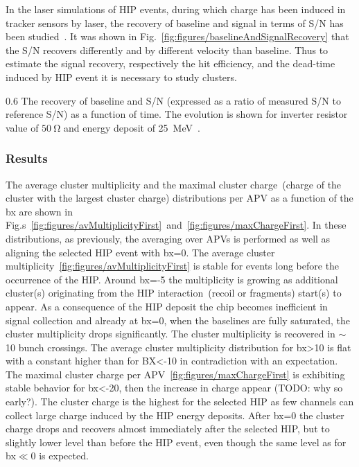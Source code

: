 In the laser simulations of HIP events, during which charge has been induced in tracker sensors by laser, the recovery of baseline and signal in terms of S/N has been studied~\cite{Adam:2005pz}. It was shown in Fig.~\ref{fig:figures/baselineAndSignalRecovery} that the S/N recovers differently and by different velocity than baseline. Thus to estimate the signal recovery, respectively the hit efficiency, and the dead-time induced by HIP event it is necessary to study clusters.

                 {0.6}       %
                 {The recovery of baseline and S/N (expressed as a ratio of measured S/N to reference S/N) as a function of time. The evolution is shown for inverter resistor value of $50~\mathrm{\Omega}$ and energy deposit of 25~MeV~\cite{Adam:2005pz}.} %

\subsubsection{Results}

The average cluster multiplicity and the maximal cluster charge~(charge of the cluster with the largest cluster charge) distributions per APV as a function of the bx are shown in Fig.s~\ref{fig:figures/avMultiplicityFirst}~and~\ref{fig:figures/maxChargeFirst}. In these distributions, as previously, the averaging over APVs is performed as well as aligning the selected HIP event with bx=0. The average cluster multiplicity~\ref{fig:figures/avMultiplicityFirst} is stable for events long before the occurrence of the HIP. Around bx=-5 the multiplicity is growing as additional cluster(s) originating from the HIP interaction~(recoil or fragments) start(s) to appear. As a consequence of the HIP deposit the chip becomes inefficient in signal collection and already at bx=0, when the baselines are fully saturated, the cluster multiplicity drops significantly. The cluster multiplicity is recovered in $\sim$10 bunch crossings. The average cluster multiplicity distribution for bx>10 is flat with a constant higher than for BX<-10 in contradiction with an expectation. The maximal cluster charge per APV~\ref{fig:figures/maxChargeFirst} is exhibiting stable behavior for bx<-20, then the increase in charge appear (TODO: why so early?). The cluster charge is the highest for the selected HIP as few channels can collect large charge induced by the HIP energy deposits. After bx=0 the cluster charge drops and recovers almost immediately after the selected HIP, but to slightly lower level than before the HIP event, even though the same level as for bx$\ll$0 is expected. 

